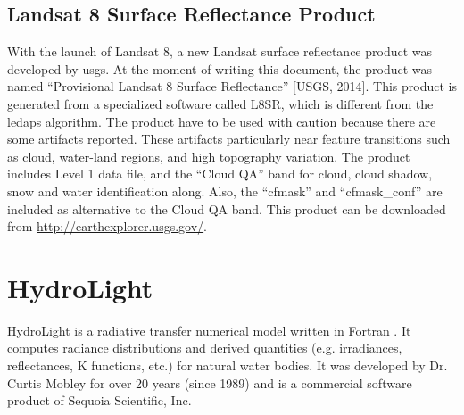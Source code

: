 \subsection{Landsat 8 Surface Reflectance Product}
\label{subsec:provisionalCDR} 
With the launch of Landsat 8, a new Landsat surface reflectance product was developed by \gls{usgs}. At the moment of writing this document, the product was named ``Provisional Landsat 8 Surface Reflectance'' [USGS, 2014]. This product is generated from a specialized software called L8SR, which is different from the \gls{ledaps} algorithm. The product have to be used with caution because there are some artifacts reported. These artifacts particularly near feature transitions such as cloud, water-land regions, and high topography variation. The product includes Level 1 data file, and the ``Cloud QA'' band for cloud, cloud shadow, snow and water identification along. Also, the ``cfmask'' and ``cfmask\_conf'' are included as alternative to the Cloud QA band. This product can be downloaded from \url{http://earthexplorer.usgs.gov/}.
\section{HydroLight}
HydroLight is a radiative transfer numerical model written in Fortran \cite{MobleyHE}. It computes radiance distributions and derived quantities (e.g. irradiances, reflectances, K functions, etc.) for natural water bodies. It was developed by Dr. Curtis Mobley for over 20 years (since 1989) and is a commercial software product of Sequoia Scientific, Inc.

